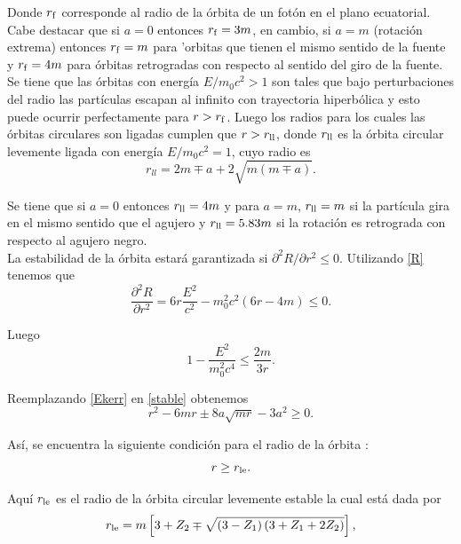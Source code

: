 Donde $r_{\rm f}$ corresponde al radio de la \'orbita de un fot\'on en el plano ecuatorial. Cabe destacar que si $a=0$ entonces $r_{\rm f}=3m$, en cambio, si $a=m$ (rotaci\'on extrema) entonces $r_{\rm f}=m$ para 'orbitas que tienen el mismo sentido de la fuente y $r_{\rm f}=4m$ para \'orbitas retrogradas con respecto al sentido del giro de la fuente.\\

Se tiene que las \'orbitas con energ\'ia $E/m_0c^2>1$ son tales que bajo perturbaciones del radio las part\'iculas escapan al infinito con trayectoria hiperb\'olica y esto puede ocurrir perfectamente para $r>r_{\rm f}$. Luego los radios para los cuales las \'orbitas circulares son ligadas cumplen que $r>r_{\rm ll}$, donde $r_{\rm ll}$ es la \'orbita circular levemente ligada con energ\'ia $E/m_0c^2=1$, cuyo radio es
\begin{equation}\label{mborbit}
r_{ll}=2m\mp a+2\sqrt{m\left(m\mp a \right)}.
\end{equation}

Se tiene que si $a=0$ entonces $r_{\rm ll}=4m$ y para $a=m$, $r_{\rm ll}=m$ si la part\'icula gira en el mismo sentido que el agujero y $r_{\rm ll}=5.83m$ si la rotaci\'on es retrograda con respecto al agujero negro.\\

La estabilidad de la \'orbita estar\'a garantizada si $\partial^2 R/\partial r^2 \leq 0$. Utilizando \eqref{R} tenemos que
\begin{equation}
\frac{\partial^2 R}{\partial r^2}=6r\frac{E^2}{c^2}-m_0^2c^2\left(6r-4m\right) \leq 0.
\end{equation}

Luego
\begin{equation}\label{stable}
1-\frac{E^2}{m_0^2c^4} \leq \frac{2m}{3r}.
\end{equation}

Reemplazando \eqref{Ekerr} en \eqref{stable} obtenemos
\begin{equation}
r^2-6mr\pm 8a\sqrt{mr}-3a^2 \geq 0.
\end{equation}

As\'i, se encuentra la siguiente condici\'on para el radio de la \'orbita :
\begin{equation}
r \geq r_{\rm le}.
\end{equation}

Aqu\'i $r_{\rm le}$ es el radio de la \'orbita circular levemente estable la cual est\'a dada por
\begin{equation}
r_{\rm le}=m\left[ 3+Z_2\mp \sqrt{\left(3-Z_1\right)\left( 3+Z_1+2Z_2\right)}\right],
\end{equation}

